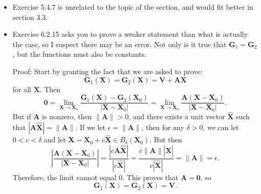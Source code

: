 \documentclass{article}
\begin{document}
\begin{itemize}

\item Exercise 5.4.7 is unrelated to the topic of the section, and would fit better in section 3.3.

\item {
    Exercise 6.2.15 asks you to prove a weaker statement than what is actually the case, so I suspect there may be an error. Not only is it true that $\mathbf{G}_1 = \mathbf{G}_2$,
    but the functions must also be constants.

    Proof: Start by granting the fact that we are asked to prove:
    \begin{equation*}
        \mathbf{G}_1(\mathbf{X}) = \mathbf{G}_2(\mathbf{X}) = \mathbf{V} + \mathbf{A}\mathbf{X}
    \end{equation*}
    for all $\mathbf{X}$. Then
    \begin{equation*}
        \mathbf{0} = \lim_{\mathbf{X} \to \mathbf{X}_0} \frac{\mathbf{G}_1(\mathbf{X}) - \mathbf{G}_2(\mathbf{X}_0)}{|\mathbf{X} - \mathbf{X}_0|} = \lim_{\mathbf{X} \to \mathbf{X}_0} \frac{\mathbf{A}(\mathbf{X} - \mathbf{X}_0)}{|\mathbf{X} - \mathbf{X}_0|}.
    \end{equation*}
    But if $\mathbf{A}$ is nonzero, then $\|\mathbf{A}\| > 0$, and there exists a unit vector $\mathbf{\hat{X}}$ such that $|\mathbf{A}\mathbf{\hat{X}}| = \|\mathbf{A}\|$.
    If we let $\epsilon = \|\mathbf{A}\|$, then for any $\delta > 0$, we can let $0 < c < \delta$ and let $\mathbf{X} = \mathbf{X}_0 + c\mathbf{\hat{X}} \in B_\delta(\mathbf{X}_0)$. But then
    \begin{equation*}
        \left|\frac{\mathbf{A}(\mathbf{X} - \mathbf{X}_0)}{|\mathbf{X} - \mathbf{X}_0|}\right| = \frac{|c\mathbf{A}\mathbf{\hat{X}}|}{|c\mathbf{\hat{X}}|} = \frac{c\|\mathbf{A}\||\mathbf{\hat{X}}|}{c|\mathbf{\hat{X}}|} = \|\mathbf{A}\| = \epsilon.
    \end{equation*}
    Therefore, the limit cannot equal 0. This proves that $\mathbf{A} = \mathbf{0}$, so
    \begin{equation*}
        \mathbf{G}_1(\mathbf{X}) = \mathbf{G}_2(\mathbf{X}) = \mathbf{V}.
    \end{equation*}
}

\end{itemize}
\end{document}
